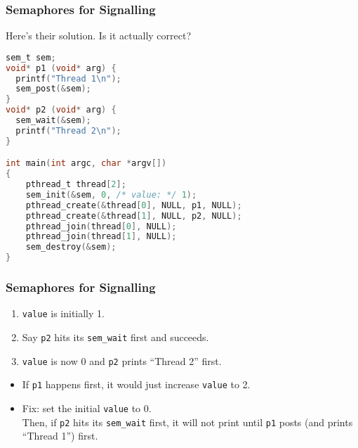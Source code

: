 \begin{frame}[fragile]
  \frametitle{Semaphores for Signalling}


  Here's their solution. Is it actually correct?

  \begin{lstlisting}[language=C]
sem_t sem;
void* p1 (void* arg) {
  printf("Thread 1\n");
  sem_post(&sem);
}
void* p2 (void* arg) {
  sem_wait(&sem);
  printf("Thread 2\n");
}

int main(int argc, char *argv[])
{
    pthread_t thread[2];
    sem_init(&sem, 0, /* value: */ 1);
    pthread_create(&thread[0], NULL, p1, NULL);
    pthread_create(&thread[1], NULL, p2, NULL);
    pthread_join(thread[0], NULL);
    pthread_join(thread[1], NULL);
    sem_destroy(&sem);
}
  \end{lstlisting}


\end{frame}

\begin{frame}[fragile]
  \frametitle{Semaphores for Signalling}

  

  \begin{enumerate}
    \item {\tt value} is initially 1.
    \vfill
    \item Say {\tt p2} hits its {\tt sem\_wait} first and succeeds.
    \vfill
    \item {\tt value} is now 0 and {\tt p2} prints ``Thread 2'' first.
  \end{enumerate}
  \begin{itemize}
    \item If {\tt p1} happens first, it would just increase
      {\tt value} to 2.\vfill
    \item<2-> Fix: set the initial {\tt value} to \alert{0}.\\[1em]
Then, if {\tt p2} hits its {\tt sem\_wait} first, it will
      not print until {\tt p1} posts (and prints ``Thread 1'') first.
  \end{itemize}~\\[1em]



\end{frame}

